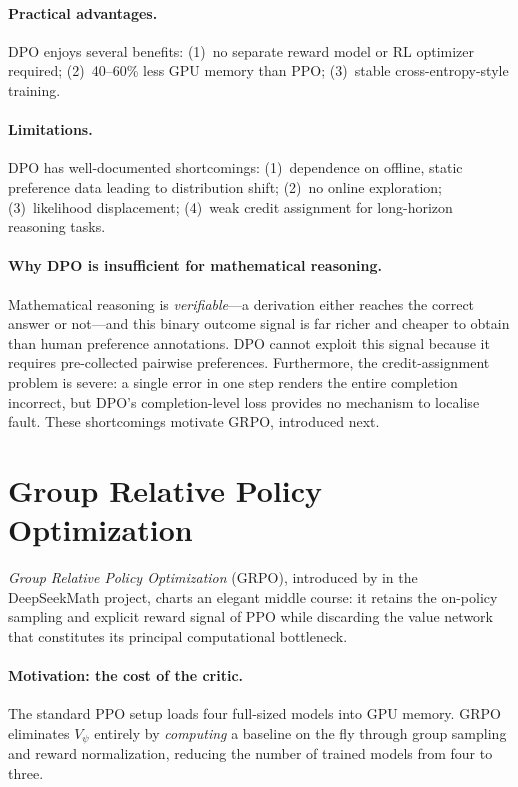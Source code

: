\documentclass[12pt,a4paper]{report}
\theoremstyle{definition}
\begin{document}
\paragraph{Practical advantages.}
DPO enjoys several benefits: (1)~no separate reward model or RL optimizer required; (2)~40--60\% less GPU memory than PPO; (3)~stable cross-entropy-style training.

\paragraph{Limitations.}
DPO has well-documented shortcomings: (1)~dependence on offline, static preference data leading to distribution shift; (2)~no online exploration; (3)~likelihood displacement; (4)~weak credit assignment for long-horizon reasoning tasks.

\paragraph{Why DPO is insufficient for mathematical reasoning.}
Mathematical reasoning is \emph{verifiable}---a derivation either reaches the correct answer or not---and this binary outcome signal is far richer and cheaper to obtain than human preference annotations. DPO cannot exploit this signal because it requires pre-collected pairwise preferences. Furthermore, the credit-assignment problem is severe: a single error in one step renders the entire completion incorrect, but DPO's completion-level loss provides no mechanism to localise fault. These shortcomings motivate GRPO, introduced next.


\section{Group Relative Policy Optimization}
\label{sec:grpo}

\emph{Group Relative Policy Optimization} (GRPO), introduced by \cite{shao2024deepseekmath} in the DeepSeekMath project, charts an elegant middle course: it retains the on-policy sampling and explicit reward signal of PPO while discarding the value network that constitutes its principal computational bottleneck.

\paragraph{Motivation: the cost of the critic.}
The standard PPO setup loads four full-sized models into GPU memory. GRPO eliminates $V_\psi$ entirely by \emph{computing} a baseline on the fly through group sampling and reward normalization, reducing the number of trained models from four to three.
\end{document}
